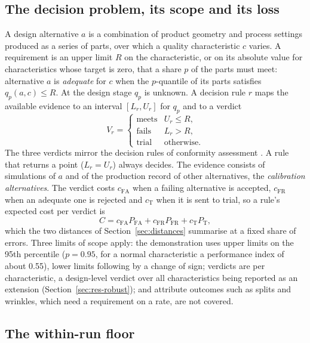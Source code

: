 \documentclass[pdflatex,sn-basic,lineno]{sn-jnl}
\begin{document}
\subsection{The decision problem, its scope and its loss}\label{sec:problem}

A design alternative $a$ is a combination of product geometry and process settings produced as a series of parts, over which a quality characteristic $c$ varies. A requirement is an upper limit $R$ on the characteristic, or on its absolute value for characteristics whose target is zero, that a share $p$ of the parts must meet: alternative $a$ is \emph{adequate} for $c$ when the $p$-quantile of its parts satisfies $q_p(a,c)\le R$. At the design stage $q_p$ is unknown. A decision rule $r$ maps the available evidence to an interval $[L_r, U_r]$ for $q_p$ and to a verdict
\begin{equation}
V_r = \begin{cases} \text{meets} & U_r \le R,\\ \text{fails} & L_r > R,\\ \text{trial} & \text{otherwise.} \end{cases}
\label{eq:verdict}
\end{equation}
The three verdicts mirror the decision rules of conformity assessment \citep{iso2017decision}. A rule that returns a point ($L_r=U_r$) always decides. The evidence consists of simulations of $a$ and of the production record of other alternatives, the \emph{calibration alternatives}. The verdict costs $c_\mathrm{FA}$ when a failing alternative is accepted, $c_\mathrm{FR}$ when an adequate one is rejected and $c_\mathrm{T}$ when it is sent to trial, so a rule's expected cost per verdict is
\begin{equation}
C = c_\mathrm{FA}P_\mathrm{FA} + c_\mathrm{FR}P_\mathrm{FR} + c_\mathrm{T}P_\mathrm{T},
\label{eq:cost}
\end{equation}
which the two distances of Section~\ref{sec:distances} summarise at a fixed share of errors. Three limits of scope apply: the demonstration uses upper limits on the 95th percentile ($p=0.95$, for a normal characteristic a performance index of about 0.55), lower limits following by a change of sign; verdicts are per characteristic, a design-level verdict over all characteristics being reported as an extension (Section~\ref{sec:res-robust}); and attribute outcomes such as splits and wrinkles, which need a requirement on a rate, are not covered.

\subsection{The within-run floor}\label{sec:floor}
\end{document}
